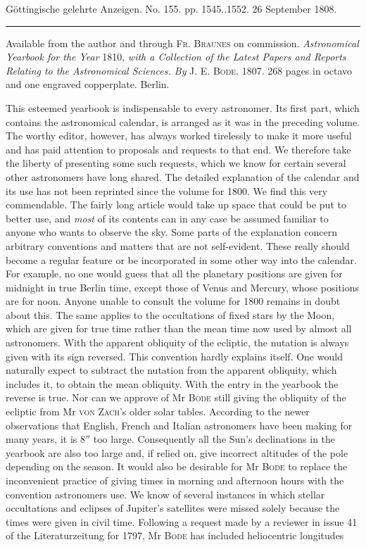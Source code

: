 \clearpage
{}
\begin{center}\small Göttingische gelehrte Anzeigen. No. 155. pp. 1545..1552. 26 September 1808.\\[3pt]\rule{.72\linewidth}{.3pt}\end{center}

Available from the author and through \textsc{Fr. Braunes} on commission. \emph{Astronomical Yearbook for the Year} 1810, \emph{with a Collection of the Latest Papers and Reports Relating to the Astronomical Sciences. By} \textsc{J. E. Bode}. 1807. 268 pages in octavo and one engraved copperplate. Berlin.

This esteemed yearbook is indispensable to every astronomer. Its first part, which contains the astronomical calendar, is arranged as it was in the preceding volume. The worthy editor, however, has always worked tirelessly to make it more useful and has paid attention to proposals and requests to that end. We therefore take the liberty of presenting some such requests, which we know for certain several other astronomers have long shared. The detailed explanation of the calendar and its use has not been reprinted since the volume for 1800. We find this very commendable. The fairly long article would take up space that could be put to better use, and \emph{most} of its contents can in any case be assumed familiar to anyone who wants to observe the sky. Some parts of the explanation concern arbitrary conventions and matters that are not self-evident. These really should become a regular feature or be incorporated in some other way into the calendar. For example, no one would guess that all the planetary positions are given for midnight in true Berlin time, except those of Venus and Mercury, whose positions are for noon. Anyone unable to consult the volume for 1800 remains in doubt about this. The same applies to the occultations of fixed stars by the Moon, which are given for true time rather than the mean time now used by almost all astronomers. With the apparent obliquity of the ecliptic, the nutation is always given with its sign reversed. This convention hardly explains itself. One would naturally expect to subtract the nutation from the apparent obliquity, which includes it, to obtain the mean obliquity. With the entry in the yearbook the reverse is true. Nor can we approve of Mr \textsc{Bode} still giving the obliquity of the ecliptic from Mr \textsc{von Zach}’s older solar tables. According to the newer observations that English, French and Italian astronomers have been making for many years, it is $8''$ too large. Consequently all the Sun’s declinations in the yearbook are also too large and, if relied on, give incorrect altitudes of the pole depending on the season. It would also be desirable for Mr \textsc{Bode} to replace the inconvenient practice of giving times in morning and afternoon hours with the convention astronomers use. We know of several instances in which stellar occultations and eclipses of Jupiter’s satellites were missed solely because the times were given in civil time. Following a request made by a reviewer in issue 41 of the Literaturzeitung for 1797, Mr \textsc{Bode} has included heliocentric longitudes 
